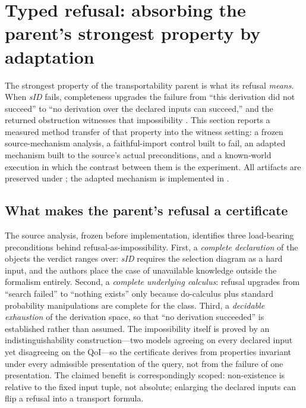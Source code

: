 \section{Typed refusal: absorbing the parent's strongest property by adaptation}
\label{sec:typed-refusal}

The strongest property of the transportability parent is what its refusal \emph{means}. When \textit{sID} fails, completeness upgrades the failure from ``this derivation did not succeed'' to ``no derivation over the declared inputs can succeed,'' and the returned obstruction witnesses that impossibility \cite{bareinboim2012completeness,bareinboim2013general}. This section reports a measured method transfer of that property into the witness setting: a frozen source-mechanism analysis, a faithful-import control built to fail, an adapted mechanism built to the source's actual preconditions, and a known-world execution in which the contrast between them is the experiment. All artifacts are preserved under ; the adapted mechanism is implemented in .

\subsection{What makes the parent's refusal a certificate}

The source analysis, frozen before implementation, identifies three load-bearing preconditions behind refusal-as-impossibility. First, a \emph{complete declaration} of the objects the verdict ranges over: \textit{sID} requires the selection diagram as a hard input, and the authors place the case of unavailable knowledge outside the formalism entirely. Second, a \emph{complete underlying calculus}: refusal upgrades from ``search failed'' to ``nothing exists'' only because do-calculus plus standard probability manipulations are complete for the class. Third, a \emph{decidable exhaustion} of the derivation space, so that ``no derivation succeeded'' is established rather than assumed. The impossibility itself is proved by an indistinguishability construction---two models agreeing on every declared input yet disagreeing on the QoI---so the certificate derives from properties invariant under every admissible presentation of the query, not from the failure of one presentation. The claimed benefit is correspondingly scoped: non-existence is relative to the fixed input tuple, not absolute; enlarging the declared inputs can flip a refusal into a transport formula.

